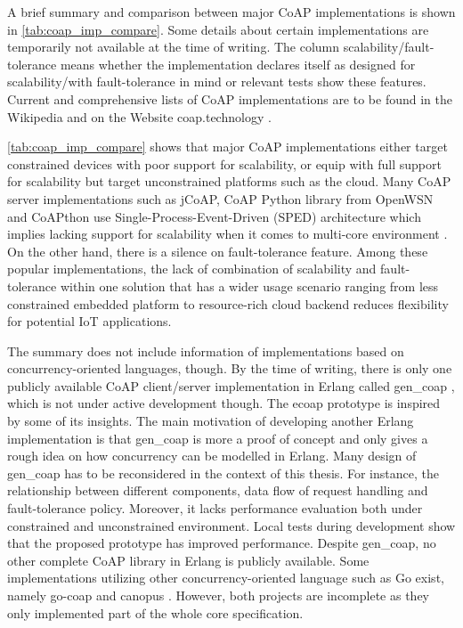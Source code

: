 A brief summary and comparison between major CoAP implementations is shown in \autoref{tab:coap_imp_compare}. Some details about certain implementations are temporarily not available at the time of writing. The column scalability/fault-tolerance means whether the implementation declares itself as designed for scalability/with fault-tolerance in mind or relevant tests show these features. Current and comprehensive lists of CoAP implementations are to be found in the Wikipedia \cite{coap_wiki} and on the Website coap.technology \cite{coap_tech}.

\autoref{tab:coap_imp_compare} shows that major CoAP implementations either target constrained devices with poor support for scalability, or equip with full support for scalability but target unconstrained platforms such as the cloud. Many CoAP server implementations such as jCoAP, CoAP Python library from OpenWSN and CoAPthon use Single-Process-Event-Driven (SPED) architecture which implies lacking support for scalability when it comes to multi-core environment \cite{kovatsch2015scalable}. On the other hand, there is a silence on fault-tolerance feature. Among these popular implementations, the lack of combination of scalability and fault-tolerance within one solution that has a wider usage scenario ranging from less constrained embedded platform to resource-rich cloud backend reduces flexibility for potential IoT applications.

The summary does not include information of implementations based on concurrency-oriented languages, though. By the time of writing, there is only one publicly available CoAP client/server implementation in Erlang called gen\_coap \cite{gen_coap}, which is not under active development though. The ecoap prototype is inspired by some of its insights. The main motivation of developing another Erlang implementation is that gen\_coap is more a proof of concept and only gives a rough idea on how concurrency can be modelled in Erlang. Many design of gen\_coap has to be reconsidered in the context of this thesis. For instance, the relationship between different components, data flow of request handling and fault-tolerance policy. Moreover, it lacks performance evaluation both under constrained and unconstrained environment. Local tests during development show that the proposed prototype has improved performance. Despite gen\_coap, no other complete CoAP library in Erlang is publicly available. Some implementations utilizing other concurrency-oriented language such as Go \cite{go} exist, namely go-coap \cite{go-coap} and canopus \cite{canopus}. However, both projects are incomplete as they only implemented part of the whole core specification. 
 
